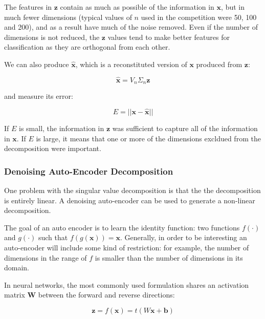 \documentclass{article}
\begin{document}
The features in $\mathbf{z}$ contain as much as possible of the information in $\mathbf{x}$, but in much fewer dimensions (typical values of $n$ used in the competition were 50, 100 and 200), and as a result have much of the noise removed.  Even if the number of dimensions is not reduced, the $\mathbf{z}$ values tend to make better features for classification as they are orthogonal from each other.

We can also produce $\hat{\mathbf{x}}$, which is a reconstituted version of $\mathbf{x}$ produced from $\mathbf{z}$:

\begin{equation}
\hat{\mathbf{x}} = V_n \Sigma_n \mathbf{z}
\end{equation}

and measure its error:

\begin{equation}
\label{eqn:decomp-error}
E = || \mathbf{x - \hat{x}} ||
\end{equation}

If $E$ is small, the information in $\mathbf{z}$ was sufficient to capture all of the information in $\mathbf{x}$.  If $E$ is large, it means that one or more of the dimensions excldued from the decomposition were important.


\subsubsection{Denoising Auto-Encoder Decomposition}

One problem with the singular value decomposition is that the the decomposition is entirely linear.  A denoising auto-encoder can be used to generate a non-linear decomposition.

The goal of an auto encoder is to learn the identity function: two functions $f(\cdot)$ and $g(\cdot)$ such that $f(g(\mathbf{x})) = \mathbf{x}$.  Generally, in order to be interesting an auto-encoder will include some kind of restriction: for example, the number of dimensions in the range of $f$ is smaller than the number of dimensions in its domain.

In neural networks, the most commonly used formulation shares an activation matrix $\mathbf{W}$ between the forward and reverse directions:

\begin{equation}
\label{eqn:autoencoder-encode}
\mathbf{z} = f(\mathbf{x}) = t(W\mathbf{x} + \mathbf{b})
\end{equation}
\end{document}

